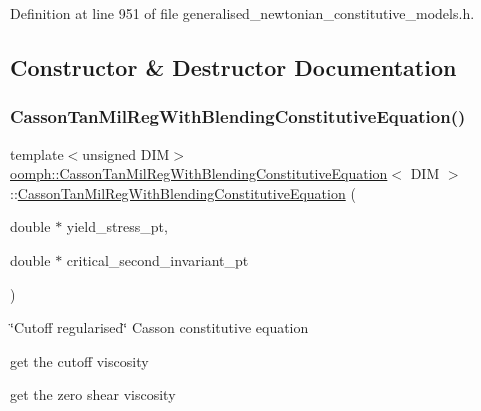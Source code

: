 Definition at line 951 of file generalised\+\_\+newtonian\+\_\+constitutive\+\_\+models.\+h.



\subsection{Constructor \& Destructor Documentation}
\mbox{\label{classoomph_1_1CassonTanMilRegWithBlendingConstitutiveEquation_a69a6c3d00d715d3793d30d588fa64227}} 
\subsubsection{\texorpdfstring{Casson\+Tan\+Mil\+Reg\+With\+Blending\+Constitutive\+Equation()}{CassonTanMilRegWithBlendingConstitutiveEquation()}}
{\footnotesize\ttfamily template$<$unsigned D\+IM$>$ \\
\hyperlink{classoomph_1_1CassonTanMilRegWithBlendingConstitutiveEquation}{oomph\+::\+Casson\+Tan\+Mil\+Reg\+With\+Blending\+Constitutive\+Equation}$<$ D\+IM $>$\+::\hyperlink{classoomph_1_1CassonTanMilRegWithBlendingConstitutiveEquation}{Casson\+Tan\+Mil\+Reg\+With\+Blending\+Constitutive\+Equation} (\begin{DoxyParamCaption}\item[{double $\ast$}]{yield\+\_\+stress\+\_\+pt,  }\item[{double $\ast$}]{critical\+\_\+second\+\_\+invariant\+\_\+pt }\end{DoxyParamCaption})\hspace{0.3cm}{\ttfamily [inline]}}



\char`\"{}\+Cutoff regularised\char`\"{} Casson constitutive equation 

get the cutoff viscosity

get the zero shear viscosity 

